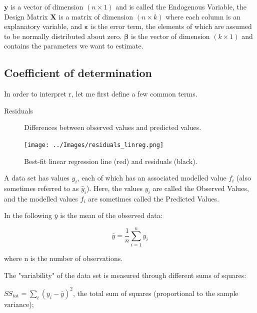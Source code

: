 $\mathbf{y}$ is a vector of dimension $(n \times 1)$ and is called the Endogenous Variable, the Design Matrix  $\mathbf{X}$ is a matrix of dimension $(n \times k)$ where each column is an explanatory variable, and $\mathbf{\varepsilon }$ is the error term, the elements of which are assumed to be normally distributed about zero. $\mathbf{\beta }$ is the vector of dimension $(k \times 1)$ and contains the parameters we want to estimate.

\subsection{Coefficient of determination}

In order to interpret r, let me first define a few common terms.

\begin{description}
  \item[Residuals] Differences between observed values and predicted values.
\end{description}

\begin{figure}
  \centering
  \texttt{[image: ../Images/residuals\_linreg.png]}\\
  \caption{Best-fit linear regression line (red) and residuals (black). }\label{fig:residuals}
\end{figure}

A data set has values $y_i$, each of which has an associated modelled value $f_i$ (also sometimes referred to as $\hat{y}_i$). Here, the values $y_i$ are called the Observed Values, and the modelled values $f_i$ are sometimes called the Predicted Values.

In the following $\bar{y}$ is the mean of the observed data:

\begin{equation}
  \bar{y}=\frac{1}{n}\sum_{i=1}^n y_i
\end{equation}

where n is the number of observations.

The "variability" of the data set is measured through different sums of squares:

\vspace{5 mm}

    $SS_\text{tot}=\sum_i (y_i-\bar{y})^2$, the total sum of squares (proportional to the sample variance);

